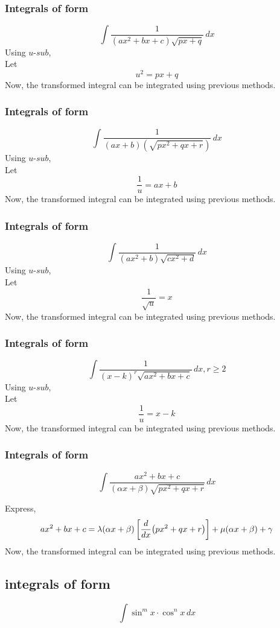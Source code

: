 \documentclass{article}
\begin{document}
\subsubsection{Integrals of form }
$$\displaystyle\int \dfrac{1}{(ax^2+bx+c) \sqrt{px+q}} \, dx$$
Using $\textit{u-sub}$,
\\
Let $$u^2=px+q$$
Now, the transformed integral can be integrated using previous methods.

\subsubsection{Integrals of form }
$$\displaystyle\int \dfrac{1}{(ax+b)(\sqrt{px^2+qx+r})} \, dx$$
Using $\textit{u-sub}$,
\\
Let $$\dfrac{1}{u}=ax+b$$
Now, the transformed integral can be integrated using previous methods.

\subsubsection{Integrals of form }
$$\displaystyle\int \dfrac{1}{(ax^2+b)\sqrt{cx^2+d}} \, dx$$
Using $\textit{u-sub}$,
\\
Let $$\dfrac{1}{\sqrt{u}}=x$$
Now, the transformed integral can be integrated using previous methods.

\subsubsection{Integrals of form }
$$\displaystyle\int \dfrac{1}{(x-k)^r\sqrt{ax^2+bx+c}} \, dx, r \ge 2$$
Using $\textit{u-sub}$,
\\
Let $$\dfrac{1}{u}=x-k$$
Now, the transformed integral can be integrated using previous methods.

\subsubsection{Integrals of form }
$$\displaystyle\int \dfrac{ax^2+bx+c}{(\alpha x + \beta)\sqrt{px^2+qx+r}} \, dx$$

Express, $$ax^2+bx+c=\lambda (\alpha x + \beta)\left[\dv{x}(px^2+qx+r)\right]+\mu (\alpha x + \beta)+\gamma$$
Now, the transformed integral can be integrated using previous methods.

\subsection{integrals of form }
$$\displaystyle\int \sin^m x \cdot \cos^n x \, dx$$
\end{document}
